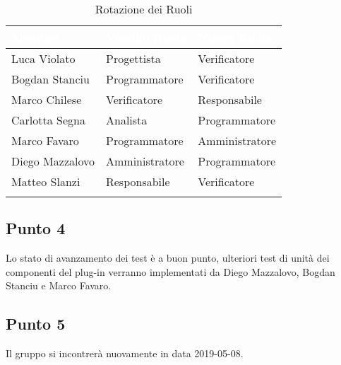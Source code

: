 \begin{center}
	\begin{longtable}[c]{|m{}|m{}|m{}|} 
		\hline
		\rowcolor{bluelogo}\textbf{\textcolor{white}{Membro}} & \textbf{\textcolor{white}{Vecchio Ruolo}} & \textbf{\textcolor{white}{Nuovo Ruolo}}\\
		\hline
		\hline
		Luca Violato & Progettista & Verificatore \\
		\hline
		\rowcolor{grigio}Bogdan Stanciu & Programmatore & Verificatore \\
		\hline
		Marco Chilese & Verificatore & Responsabile\\
		\hline
		\rowcolor{grigio}Carlotta Segna & Analista & Programmatore\\
		\hline
		Marco Favaro & Programmatore & Amministratore \\
		\hline
		\rowcolor{grigio} Diego Mazzalovo & Amministratore & Programmatore\\
		\hline
		Matteo Slanzi & Responsabile & Verificatore\\
		\hline
		\caption{Rotazione dei Ruoli}
	\end{longtable}

\end{center}

\subsection{Punto 4}
Lo stato di avanzamento dei test è a buon punto, ulteriori test di unità dei componenti del plug-in verranno implementati da Diego Mazzalovo, Bogdan Stanciu e Marco Favaro.

	
\subsection{Punto 5}
Il gruppo si incontrerà nuovamente in data 2019-05-08.
